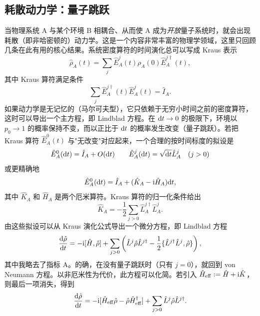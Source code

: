 \documentclass[a4paper,10pt,oneside,onecolumn,1p,times]{elsarticle}
\newcommand{\diff}{{\rm d}}
\newcommand{\imag}{{\rm i }}
\begin{document}
\subsection{耗散动力学：量子跳跃}
当物理系统 A 与某个环境 B 相耦合、从而使 A 成为{\em 开放}量子系统时，就会出现耗散（即非哈密顿的）动力学。这是一个内容非常丰富的物理学领域，这里只回顾几条在此有用的核心结果。系统密度算符的时间演化总可以写成 Kraus 表示
\begin{equation}
\hat{\rho}_A (t) = \sum_j \hat{E}_A^j(t) \hat{\rho}_A (0) \hat{E}_A^{j\dagger}(t),
\end{equation}
其中 Kraus 算符满足条件
\begin{equation}
\sum_j \hat{E}_A^{j\dagger}(t) \hat{E}_A^j(t) = \hat{I}_A .
\end{equation}
如果动力学是无记忆的（马尔可夫型），它只依赖于无穷小时间之前的密度算符，这时可以导出一个主方程，即 Lindblad 方程。在 $\diff t\rightarrow 0$ 的极限下，环境以 $p_0 \rightarrow 1$ 的概率保持不变，而以正比于 $\diff t$ 的概率发生改变（量子跳跃）。若把 Kraus 算符 $\hat{E}_A^0(t)$ 与"无改变"对应起来，一个合理的按时间标度的拟设是
\begin{equation}
\hat{E}_A^0(\diff t) = \hat{I}_A + O(\diff t) \quad\quad \hat{E}_A^j(\diff t) = \sqrt{\diff t} \hat{L}_A^j  \quad (j>0)
\end{equation}
或更精确地
\begin{equation}
\hat{E}_A^0(\diff t) = \hat{I}_A + (\hat{K}_A - \imag \hat{H}_A) \diff t ,
\end{equation}
其中 $\hat{K}_A$ 和 $\hat{H}_A$ 是两个厄米算符。Kraus 算符的归一化条件给出
\begin{equation}
\hat{K}_A = -\frac{1}{2} \sum_{j>0} \hat{L}_A^{j\dagger} \hat{L}_A^j .
\end{equation}
由这些拟设可以从 Kraus 演化公式导出一个微分方程，即 Lindblad 方程
\begin{equation}
\frac{\diff \hat{\rho}}{\diff t} = - \imag [\hat{H},\hat{\rho}] + \sum_{j>0} \left( \hat{L}^j \hat{\rho} \hat{L}^{j\dagger} - \frac{1}{2} \{ \hat{L}^{j\dagger} \hat{L}^j, \hat{\rho} \} \right) ,
\end{equation} 
其中我略去了指标 A。的确，在没有量子跳跃时（只有 $j=0$），就回到 von Neumann 方程。以非厄米性为代价，此方程可以化简。若引入 $\hat{H}_{{\rm eff}} := \hat{H} + \imag \hat{K}$，则最后一项消失，得到
\begin{equation}
\frac{\diff \hat{\rho}}{\diff t} = - \imag [\hat{H}_{{\rm eff}}\hat{\rho}-\hat{\rho}\hat{H}_{{\rm eff}}^\dagger] + \sum_{j>0} \hat{L}^j \hat{\rho} \hat{L}^{j\dagger} .
\label{eq:Lindblad2}
\end{equation} 
\end{document}
